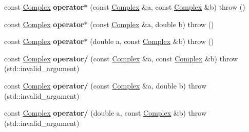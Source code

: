 \begin{DoxyCompactItemize}
\item 
\mbox{\label{classkerbal_1_1math_1_1_complex_af503506eaa537cb05f49a2784fadf999}} 
const \hyperlink{classkerbal_1_1math_1_1_complex}{Complex} {\bfseries operator$\ast$} (const \hyperlink{classkerbal_1_1math_1_1_complex}{Complex} \&a, const \hyperlink{classkerbal_1_1math_1_1_complex}{Complex} \&b)  throw ()
\item 
\mbox{\label{classkerbal_1_1math_1_1_complex_a00cfb5e70f64e52991c57cfac2bb8252}} 
const \hyperlink{classkerbal_1_1math_1_1_complex}{Complex} {\bfseries operator$\ast$} (const \hyperlink{classkerbal_1_1math_1_1_complex}{Complex} \&a, double b)  throw ()
\item 
\mbox{\label{classkerbal_1_1math_1_1_complex_af8729d0aa381aed3cf7c09264f6c8935}} 
const \hyperlink{classkerbal_1_1math_1_1_complex}{Complex} {\bfseries operator$\ast$} (double a, const \hyperlink{classkerbal_1_1math_1_1_complex}{Complex} \&b)  throw ()
\item 
\mbox{\label{classkerbal_1_1math_1_1_complex_ac7fcef88e31975a91648f5a664cbb5ff}} 
const \hyperlink{classkerbal_1_1math_1_1_complex}{Complex} {\bfseries operator/} (const \hyperlink{classkerbal_1_1math_1_1_complex}{Complex} \&a, const \hyperlink{classkerbal_1_1math_1_1_complex}{Complex} \&b)  throw (std\+::invalid\+\_\+argument)
\item 
\mbox{\label{classkerbal_1_1math_1_1_complex_a301f8205c3cc1e4a4a9fcb844a477176}} 
const \hyperlink{classkerbal_1_1math_1_1_complex}{Complex} {\bfseries operator/} (const \hyperlink{classkerbal_1_1math_1_1_complex}{Complex} \&a, double b)  throw (std\+::invalid\+\_\+argument)
\item 
\mbox{\label{classkerbal_1_1math_1_1_complex_aae00c0bd79012b3459871b81074a8b1c}} 
const \hyperlink{classkerbal_1_1math_1_1_complex}{Complex} {\bfseries operator/} (double a, const \hyperlink{classkerbal_1_1math_1_1_complex}{Complex} \&b)  throw (std\+::invalid\+\_\+argument)
\item 
\mbox{\label{classkerbal_1_1math_1_1_complex_a5a73e9d4e68af8cedb95bd0864054b89}} 

\end{DoxyCompactItemize}
